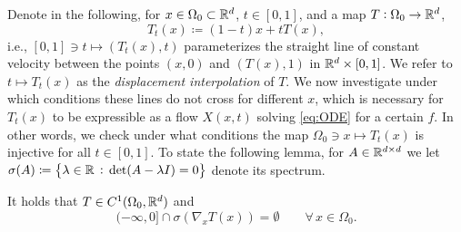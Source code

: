 Denote in the following, for $x\in\Omega_0\subset\mathbb{R}^d$,
  $t\in [0,1]$, and a map $T:\Omega_0\to\mathbb{R}^d$,
  \begin{equation}\label{eq:Tt}
    T_t(x)  \coloneqq  (1-t)x + tT(x),
  \end{equation}
  i.e., $[0,1]\ni t\mapsto (T_t(x),t)$ parameterizes the straight line of constant velocity
  between the points $(x,0)$ and $(T(x),1)$ in $\mathbb{R}^d\times [0,1]$. 
  We
  refer to $t\mapsto T_t(x)$ as the \emph{displacement interpolation}
  of $T$. We now investigate under which conditions these lines do not
  cross for different $x$, which is necessary for $T_t(x)$ to
  be expressible as a flow $X(x,t)$ solving \eqref{eq:ODE} for a
  certain $f$. In other words, we check under what conditions the map
  $\Omega_0\ni x\mapsto T_t(x)$ is injective for all $t\in [0,1]$. To
  state the following lemma, for $A\in\mathbb{R}^{d\times d}$ we let $\sigma(A) \coloneqq \left\{\lambda\in\mathbb{R}\, :\,\det(A-\lambda I)=0\right\}$ denote its spectrum.  



  \begin{assumption}\label{ass:T}
    It holds that $T\in C^1(\Omega_0,\mathbb{R}^d)$ and
    \begin{equation}\label{eq:spectrum}
      (-\infty, 0]\cap \sigma(\nabla_x T(x)) = \emptyset\qquad
      \forall\,x\in\Omega_0.
    \end{equation}
  \end{assumption}





